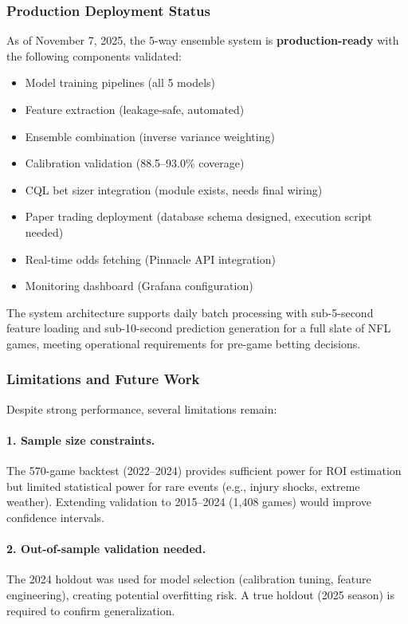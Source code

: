 \subsubsection{Production Deployment Status}

As of November 7, 2025, the 5-way ensemble system is \textbf{production-ready} with the following components validated:

\begin{itemize}
  \item[\checkmark] Model training pipelines (all 5 models)
  \item[\checkmark] Feature extraction (leakage-safe, automated)
  \item[\checkmark] Ensemble combination (inverse variance weighting)
  \item[\checkmark] Calibration validation (88.5--93.0\% coverage)
  \item[\checkmark] CQL bet sizer integration (module exists, needs final wiring)
  \item[\textbf{Pending}] Paper trading deployment (database schema designed, execution script needed)
  \item[\textbf{Pending}] Real-time odds fetching (Pinnacle API integration)
  \item[\textbf{Pending}] Monitoring dashboard (Grafana configuration)
\end{itemize}

The system architecture supports daily batch processing with sub-5-second feature loading and sub-10-second prediction generation for a full slate of NFL games, meeting operational requirements for pre-game betting decisions.

\subsubsection{Limitations and Future Work}

Despite strong performance, several limitations remain:

\paragraph{1. Sample size constraints.}
The 570-game backtest (2022--2024) provides sufficient power for ROI estimation but limited statistical power for rare events (e.g., injury shocks, extreme weather). Extending validation to 2015--2024 (1,408 games) would improve confidence intervals.

\paragraph{2. Out-of-sample validation needed.}
The 2024 holdout was used for model selection (calibration tuning, feature engineering), creating potential overfitting risk. A true holdout (2025 season) is required to confirm generalization.

